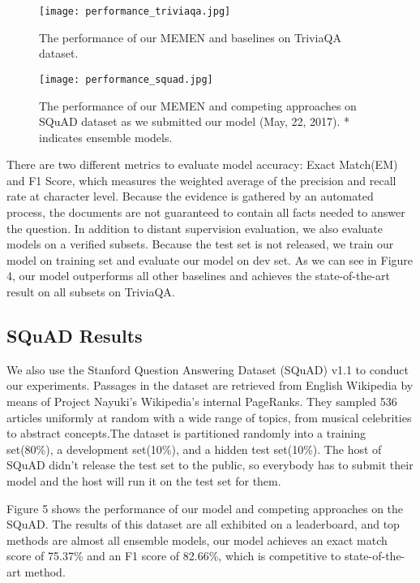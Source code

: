 \documentclass[letterpaper]{article}
\begin{document}
\begin{figure}[htbp]
  \begin{center}
  \texttt{[image: performance\_triviaqa.jpg]}
  \caption{The performance of our MEMEN and baselines on TriviaQA dataset.}
  \end{center}
\end{figure}

  \begin{figure*}[htbp]
  \begin{center}
  \texttt{[image: performance\_squad.jpg]}
  \caption{The performance of our MEMEN and competing approaches on SQuAD dataset as we submitted our model (May, 22, 2017). * indicates ensemble models.}
  \end{center}
\end{figure*}

There are two different metrics to evaluate model accuracy: Exact Match(EM) and F1 Score, which measures the weighted average of the precision and recall rate at character level. Because the evidence is gathered by an automated process, the documents are not guaranteed to contain all facts needed to answer the question. In addition to distant supervision evaluation, we also evaluate models on a verified subsets. Because the test set is not released, we train our model on training set and evaluate our model on dev set. As we can see in Figure 4, our model outperforms all other baselines and achieves the state-of-the-art result on all subsets on TriviaQA.


\subsection{SQuAD Results}
We also use the Stanford Question Answering Dataset (SQuAD) v1.1 to conduct our experiments. Passages in the dataset are retrieved from English Wikipedia by means of Project Nayuki's Wikipedia's internal PageRanks. They sampled 536 articles uniformly at random with a wide range of topics, from musical celebrities to abstract concepts.The dataset is partitioned randomly into a training set(80\%), a development set(10\%), and a hidden test set(10\%). The host of SQuAD didn't release the test set to the public, so everybody has to submit their model and the host will run it on the test set for them. 

Figure 5 shows the performance of our model and competing approaches on the SQuAD. The results of this dataset are all exhibited on a leaderboard, and top methods are almost all ensemble models, our model achieves an exact match score of 75.37\% and an F1 score of 82.66\%, which is competitive to state-of-the-art method. 
\end{document}
